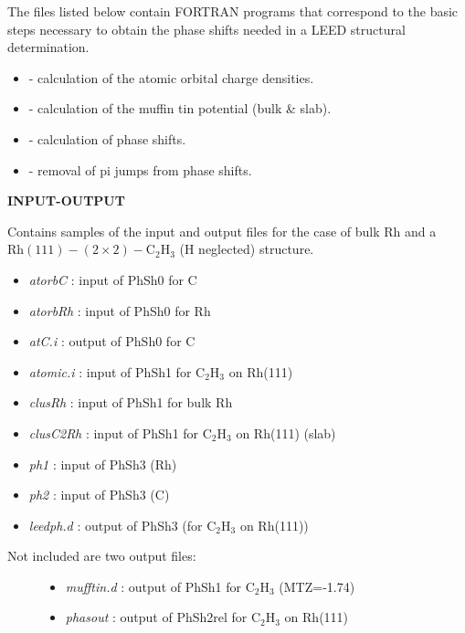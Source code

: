\documentclass[letterpaper,10pt,english]{sphinxmanual}
\begin{document}
The files listed below contain FORTRAN programs that correspond to the basic
steps necessary to obtain the phase shifts needed in a LEED structural
determination.
\begin{itemize}
\item {} 
    - calculation of the atomic orbital charge densities.

\item {} 
    - calculation of the muffin tin potential (bulk \& slab).

\item {} 
   - calculation of phase shifts.

\item {} 
    - removal of pi jumps from phase shifts.

\end{itemize}

\textbf{INPUT-OUTPUT}

Contains samples of the input and output files for the case of bulk
Rh and a \(\text{Rh} (111)-(2 \times 2)- \text{C} _2 \text{H} _3\) (H neglected) structure.
\begin{itemize}
\item {} 
\emph{atorbC}     : input of PhSh0 for C

\item {} 
\emph{atorbRh}    : input of PhSh0 for Rh

\item {} 
\emph{atC.i}      : output of PhSh0 for C

\item {} 
\emph{atomic.i}   : input of PhSh1 for \(\text{C} _2 \text{H} _3\) on Rh(111)

\item {} 
\emph{clusRh}     : input of PhSh1 for bulk Rh

\item {} 
\emph{clusC2Rh}   : input of PhSh1 for \(\text{C} _2 \text{H} _3\) on Rh(111) (slab)

\item {} 
\emph{ph1}        : input of PhSh3 (Rh)

\item {} 
\emph{ph2}        : input of PhSh3 (C)

\item {} 
\emph{leedph.d}   : output of PhSh3 (for \(\text{C} _2 \text{H} _3\) on Rh(111))

\end{itemize}
\begin{description}
\item[{Not included are two output files:}] \leavevmode\begin{itemize}
\item {} 
\emph{mufftin.d}  : output of PhSh1 for \(\text{C} _2 \text{H} _3\) (MTZ=-1.74)

\item {} 
\emph{phasout}    : output of PhSh2rel for \(\text{C} _2 \text{H} _3\) on Rh(111)

\end{itemize}

\end{description}
\end{document}

